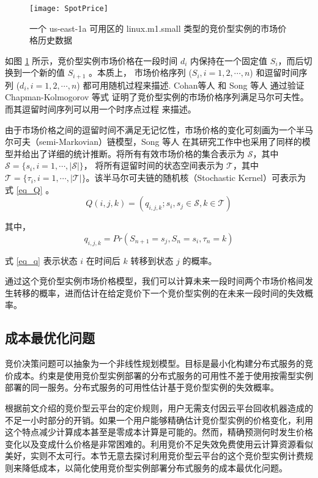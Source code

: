 \begin{figure}
  \centering
  \texttt{[image: SpotPrice]}
  \caption{一个 us-east-1a 可用区的 linux.m1.small 类型的竞价型实例的市场价格历史数据}
  \label{figure:sil}
\end{figure}

如图 \ref{figure:sil} 所示，竞价型实例市场价格在一段时间 $d_i$ 内保持在一个固定值 $S_{i}$，而后切换到一个新的值 $S_{i+1}$ 。本质上，
市场价格序列 ($S_i, i = 1, 2, \cdots, n$) 和逗留时间序列 ($d_i, i = 1, 2, \cdots, n$) 都可用随机过程来描述. Cohan等人 \cite{chohan2010see} 和 Song 等人 \cite{song2012optimal} 通过验证 Chapman-Kolmogorov 等式 \cite{grimmett1992probability} 证明了竞价型实例的市场价格序列满足马尔可夫性。而其逗留时间序列可以用一个时序点过程 \cite{eltit} 来描述。

由于市场价格之间的逗留时间不满足无记忆性，市场价格的变化可刻画为一个半马尔可夫（semi-Markovian）链模型，Song 等人 \cite{song2012optimal} 在其研究工作中也采用了同样的模型并给出了详细的统计推断。将所有有效市场价格的集合表示为 $\mathcal{S}$，其中 $\mathcal{S} = \{s_i, i = 1, \cdots, \left|\mathcal{S}\right|\}$， 将所有逗留时间的状态空间表示为 $\mathcal{T}$，其中 $\mathcal{T} = \{\tau_i, i = 1, \cdots, \left|\mathcal{T}\right|\}$。该半马尔可夫链的随机核（Stochastic Kernel）可表示为式 \eqref{eq_Q} 。
\begin{equation}\label{eq_Q}
Q(i, j, k) = (q_{i, j, k}; s_i, s_j \in \mathcal{S}, k \in \mathcal{T})
\end{equation}

其中，
\begin{equation}\label{eq_q}
q_{i, j, k} = Pr(S_{n+1} = s_j, S_n = s_i, \tau_n = k)
\end{equation}

式 \eqref{eq_q} 表示状态 $i$ 在时间后 $k$ 转移到状态 $j$ 的概率。

通过这个竞价型实例市场价格模型，我们可以计算未来一段时间两个市场价格间发生转移的概率，进而估计在给定竞价下一个竞价型实例的在未来一段时间的失效概率。

\subsection{成本最优化问题}
竞价决策问题可以抽象为一个非线性规划模型。目标是最小化构建分布式服务的竞价成本。约束是使用竞价型实例部署的分布式服务的可用性不差于使用按需型实例部署的同一服务。分布式服务的可用性估计基于竞价型实例的失效概率。

根据前文介绍的竞价型云平台的定价规则，用户无需支付因云平台回收机器造成的不足一小时部分的开销。如果一个用户能够精确估计竞价型实例的价格变化，利用这个特点减少计算成本甚至是零成本计算是可能的。然而，精确预测何时发生价格变化以及变成什么价格是非常困难的。利用竞价不足失效免费使用云计算资源看似美好，实则不太可行。本节无意去探讨利用竞价型云平台的这个竞价型实例计费规则来降低成本，以简化使用竞价型实例部署分布式服务的成本最优化问题。

